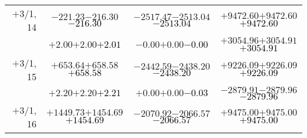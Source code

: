 \documentclass[compress]{beamer}
\begin{document}
\begin{frame}
{\begin{tabular}{r | c | c | c}
$+$3/1, 14 & $-221.23$\hspace{0.1 cm}$-216.30$\hspace{0.1 cm}\textcolor{black}{$-216.30$} & $-2517.47$\hspace{0.1 cm}$-2513.04$\hspace{0.1 cm}\textcolor{black}{$-2513.04$} & $+9472.60$\hspace{0.1 cm}$+9472.60$\hspace{0.1 cm}\textcolor{black}{$+9472.60$} \\
           & $+2.00$\hspace{0.1 cm}$+2.00$\hspace{0.1 cm}\textcolor{black}{$+2.01$} & $-0.00$\hspace{0.1 cm}$+0.00$\hspace{0.1 cm}\textcolor{black}{$-0.00$} & $+3054.96$\hspace{0.1 cm}$+3054.91$\hspace{0.1 cm}\textcolor{black}{$+3054.91$} \\
$+$3/1, 15 & $+653.64$\hspace{0.1 cm}$+658.58$\hspace{0.1 cm}\textcolor{black}{$+658.58$} & $-2442.59$\hspace{0.1 cm}$-2438.20$\hspace{0.1 cm}\textcolor{black}{$-2438.20$} & $+9226.09$\hspace{0.1 cm}$+9226.09$\hspace{0.1 cm}\textcolor{black}{$+9226.09$} \\
           & $+2.20$\hspace{0.1 cm}$+2.20$\hspace{0.1 cm}\textcolor{black}{$+2.21$} & $+0.00$\hspace{0.1 cm}$+0.00$\hspace{0.1 cm}\textcolor{black}{$-0.03$} & $-2879.91$\hspace{0.1 cm}$-2879.96$\hspace{0.1 cm}\textcolor{black}{$-2879.96$} \\
$+$3/1, 16 & $+1449.73$\hspace{0.1 cm}$+1454.69$\hspace{0.1 cm}\textcolor{black}{$+1454.69$} & $-2070.92$\hspace{0.1 cm}$-2066.57$\hspace{0.1 cm}\textcolor{black}{$-2066.57$} & $+9475.00$\hspace{0.1 cm}$+9475.00$\hspace{0.1 cm}\textcolor{black}{$+9475.00$} \\

\end{tabular}}
\end{frame}
\end{document}
